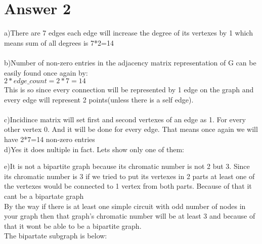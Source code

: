 \documentclass[12pt]{article}
\begin{document}
\section*{Answer 2}
a)There are 7 edges each edge will increase the degree of its vertexes by 1 which means sum of all degrees is 7*2=14\\
\\
b)Number of non-zero entries in the adjacency matrix representation of G can be easily found once again by:\\
$2*edge\_count=2*7=14$\\
This is so since every connection will be represented by 1 edge on the graph and every edge will represent 2 points(unless there is a self edge).\\
\\
c)Incidince matrix will set first and second vertexes of an edge as 1. For every other vertex 0. And it will be done for every edge. That means once again we will have 2*7=14 non-zero entries\\
d)Yes it does nultiple in fact. Lets show only one of them:\\
\begin{figure}[H]
	\centering
	\label{fig:g2}
\end{figure}
e)It is not a bipartite graph because its chromatic number is not 2 but 3. Since its chromatic number is 3 if we tried to put its vertexes in 2 parts at least one of the vertexes would be connected to 1 vertex from both parts. Because of that it cant be a bipartate graph\\
By the way if there is at least one simple circuit with odd number of nodes in your graph then that graph's chromatic number will be at least 3 and because of that it wont be able to be a bipartite graph.\\
The bipartate subgraph is below:\\
\begin{figure}[H]
	\centering
	\label{fig:g2}
\end{figure}
\end{document}

